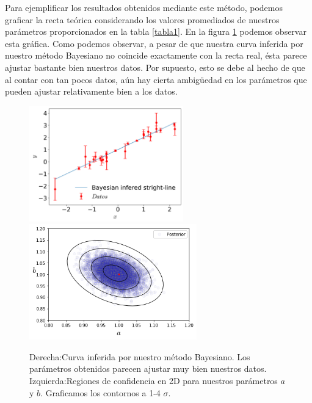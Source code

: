 \documentclass[10.5pt,prb,
               showpacs,            %
               preprintnumbers,     %
               aps,                 %
               prl,          	    %
               letterpaper,             %
               superscriptaddress,      %
               nofootinbib,         %
               tightenlines,        %
               floats,floatfix      %
               ,usenatbib]{revtex4-1}%
\begin{document}
Para ejemplificar los resultados obtenidos mediante este m\'etodo, podemos graficar la recta te\'orica considerando los valores promediados de nuestros par\'ametros proporcionados en la tabla \ref{tabla1}. En la figura \ref{fig:datastr} podemos observar esta gr\'afica. Como podemos observar, a pesar de que nuestra curva inferida por nuestro m\'etodo Bayesiano no coincide exactamente con la recta real, \'esta parece ajustar bastante bien nuestros datos. Por supuesto, esto se debe al hecho de que al contar con tan pocos datos, a\'un hay cierta ambig\"uedad en los par\'ametros que pueden ajustar relativamente bien a los datos. 

\begin{figure}[ht] 
\includegraphics[trim = 1mm  1mm 1mm 1mm, clip, width=8.cm, height=5cm]{datastr.png} \qquad
\includegraphics[trim = 1mm  1mm 1mm 1mm, clip, width=6.cm, height=5cm]{cab.png}
\caption{Derecha:Curva inferida por nuestro m\'etodo Bayesiano. Los par\'ametros obtenidos parecen ajustar muy bien nuestros datos.
Izquierda:Regiones de confidencia en 2D para nuestros par\'ametros $a$ y $b$. Graficamos los contornos a 1-4 $\sigma$. }%
\label{fig:datastr}
\end{figure}


\end{document}
